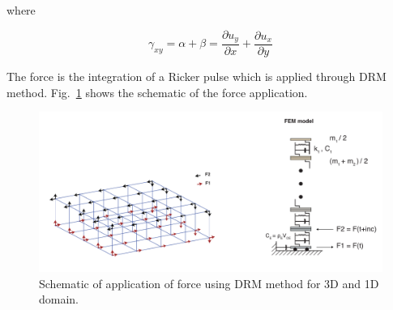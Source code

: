 where

\begin{equation}
\gamma_{xy}=\alpha + \beta = \frac{\partial u_y}{\partial x} + \frac{\partial u_x}{\partial y}
\end{equation}

The force is the integration of a Ricker pulse which is applied through DRM method. Fig.~\ref{fig:DRM_schematic} shows the schematic of the force application. 

 \begin{figure}
    \centering
    \includegraphics[width=\textwidth]{figures/pdf/DRM_schematic.pdf}
    \caption{Schematic of application of force using DRM method for 3D and 1D domain.}
    \label{fig:DRM_schematic}
\end{figure}
